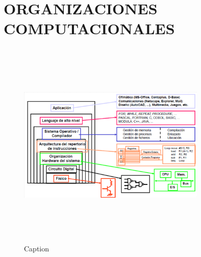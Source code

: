 \section{ORGANIZACIONES COMPUTACIONALES}

\begin{figure}[H]
    \centering
    \includegraphics[width=0.8\textwidth, height=10cm,keepaspectratio]{chapters/chapter0/figures/Ubicacion lenguajes de programacion.png}
    \caption{Caption}
    \label{fig:my_label}
\end{figure}

